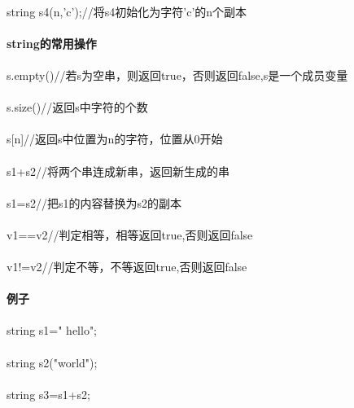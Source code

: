 \documentclass{article}
\begin{document}
\begin{CJK}{UTF8}{gbsn}
\paragraph{}
string s4(n,'c');//将s4初始化为字符'c'的n个副本
\paragraph{string的常用操作}
\paragraph{}
s.empty()//若s为空串，则返回true，否则返回false,s是一个成员变量
\paragraph{}
s.size()//返回s中字符的个数
\paragraph{}
s[n]//返回s中位置为n的字符，位置从0开始
\paragraph{}
s1+s2//将两个串连成新串，返回新生成的串
\paragraph{}
s1=s2//把s1的内容替换为s2的副本
\paragraph{}
v1==v2//判定相等，相等返回true,否则返回false
\paragraph{}
v1!=v2//判定不等，不等返回true,否则返回false
\paragraph{例子}
\paragraph{}
string s1=" hello";
\paragraph{}
string s2("world");
\paragraph{}
string s3=s1+s2;

\end{CJK}
\end{document}
